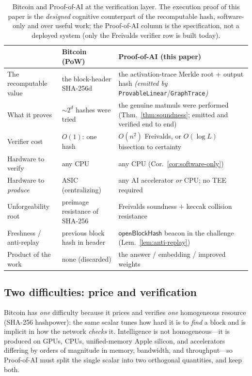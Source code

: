 \begin{table}[t]
\centering
\caption{Bitcoin and Proof-of-AI at the verification layer. The execution proof of
this paper is the \emph{designed} cognitive counterpart of the recomputable hash,
software-only and over useful work; the Proof-of-AI column is the specification, not a
deployed system (only the Freivalds verifier row is built today).}
\label{tab:bitcoin-verify}
\small
\begin{tabular}{@{}p{3.2cm}p{4.3cm}p{5.3cm}@{}}
\toprule
 & Bitcoin (PoW) & Proof-of-AI (this paper) \\
\midrule
The recomputable value & the block-header SHA-256d & the activation-trace Merkle root + output hash \emph{(emitted by} \texttt{ProvableLinear}/\texttt{GraphTrace}\emph{)} \\
What it proves & $\sim 2^{d}$ hashes were tried & the genuine matmuls were performed (Thm.~\ref{thm:soundness}; emitted and verified end to end) \\
Verifier cost & $O(1)$: one hash & $O(n^2)$ Freivalds, or $O(\log L)$ bisection to certainty \\
Hardware to verify & any CPU & any CPU (Cor.~\ref{cor:software-only}) \\
Hardware to \emph{produce} & ASIC (centralizing) & any AI accelerator \emph{or} CPU; no TEE required \\
Unforgeability root & preimage resistance of SHA-256 & Freivalds soundness $+$ keccak collision resistance \\
Freshness / anti-replay & previous block hash in header & $\mathsf{openBlockHash}$ beacon in the challenge (Lem.~\ref{lem:anti-replay}) \\
Product of the work & none (discarded) & the answer / embedding / improved weights \\
\bottomrule
\end{tabular}
\end{table}

\subsection{Two difficulties: price and verification}

Bitcoin has \emph{one} difficulty because it prices and verifies \emph{one}
homogeneous resource (SHA-256 hashpower): the same scalar tunes how hard it is to
\emph{find} a block and is implicit in how the network \emph{checks} it. Intelligence
is not homogeneous---it is produced on GPUs, CPUs, unified-memory Apple silicon, and
accelerators differing by orders of magnitude in memory, bandwidth, and
throughput---so Proof-of-AI must split the single scalar into two orthogonal
quantities, and keep both.

